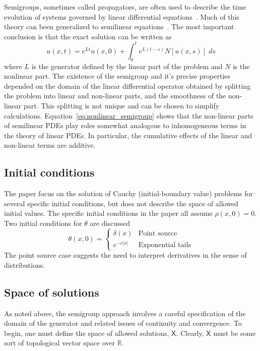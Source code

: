 \documentclass[12pt]{amsart}
\begin{document}
Semigroups, sometimes called propagators, are often used to describe
the time evolution of systems governed by linear differential
equations~\cite{Pazy:1983,EngelNagel:2000}.  Much of this theory can
been generalized to semilinear
equations~\cite{Miyadera:1992,CazenaveHaraux:1998,Bellini-MoranteMcBride:1998}.
The most important conclusion is that the exact solution can be
written as
\begin{equation}
  u(x,t) = e^{Lt} u(x, 0) + \int_{0}^{t} e^{L(t-s)}N\left[u(x, s)\right] \; ds
  \label{eq:nonlinear_semigroup}
\end{equation}
where $L$ is the generator defined by the linear part of the problem
and $N$ is the nonlinear part.  The existence of the semigroup and
it's precise properties depended on the domain of the linear
differential operator obtained by splitting the problem into linear
and non-linear parts, and the smoothness of the non-linear part.  This
splitting is not unique and can be chosen to simplify calculations.
Equation~\ref{eq:nonlinear_semigroup} shows that the non-linear parts
of semilinear PDEs play roles somewhat analogous to inhomogeneous
terms in the theory of linear PDEs.  In particular, the cumulative
effects of the linear and non-linear terms are additive.

\subsection{Initial conditions}

The paper focus on the solution of Cauchy (initial-boundary value)
problems for several specific initial conditions, but does not
describe the space of allowed initial values.  The specific initial
conditions in the paper all assume $\rho(x, 0) = 0$.  Two initial
conditions for $\theta$ are discussed
\begin{equation}
  \theta(x, 0) =
  \begin{cases}
    \delta(x) & \text{Point source} \\
    e^{-c\left|x\right|} & \text{Exponential tails}
  \end{cases}
\end{equation}
The point source case suggests the need to interpret derivatives in
the sense of distributions.

\subsection{Space of solutions}

As noted above, the semigroup approach involves a careful
specification of the domain of the generator and related issues of
continuity and convergence.  To begin, one must define the space of
allowed solutions, $\mathsf{X}$.  Clearly, $\mathsf{X}$ must be some
sort of topological vector space over $\mathbb{R}$.
\end{document}
